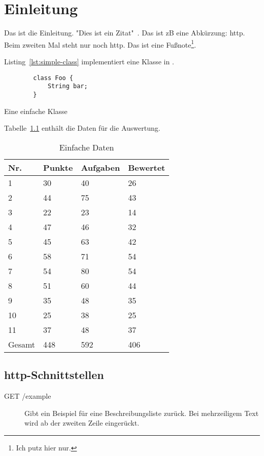 \chapter{Einleitung}\label{ch:introduction}

Das ist die Einleitung.
"Dies ist ein Zitat"~\cite{dragon-book}.
Das ist \ac{zB} eine Abkürzung: \ac{http}.
Beim zweiten Mal steht nur noch \ac{http}.
Das ist eine Fußnote\footnote{Ich putz hier nur.}.

Listing~\ref{lst:simple-class} implementiert eine Klasse in .

\begin{listing}[htp]
    \begin{verbatim}
        class Foo {
            String bar;
        }
    \end{verbatim}
    \caption{Eine einfache Klasse}
    \label{lst:simple-class}
\end{listing}

Tabelle~\ref{tbl:evaluation-data} enthält die Daten für die Auswertung.

\begin{table}[htp]
    \centering
    \caption{Einfache Daten}
    \begin{tabular}{|l|l|l|l|}
    \hline
        Nr. & Punkte & Aufgaben & Bewertet \\
        \hline
        1  & 30 & 40 & 26 \\
        2  & 44 & 75 & 43 \\
        3  & 22 & 23 & 14 \\
        4  & 47 & 46 & 32 \\
        5  & 45 & 63 & 42 \\
        6  & 58 & 71 & 54 \\
        7  & 54 & 80 & 54 \\
        8  & 51 & 60 & 44 \\
        9  & 35 & 48 & 35 \\
        10 & 25 & 38 & 25 \\
        11 & 37 & 48 & 37 \\
        \hline
        Gesamt & 448 & 592 & 406 \\
        \hline
    \end{tabular}
    \label{tbl:evaluation-data}
\end{table}

\section{\acs{http}-Schnittstellen} %

\begin{description}
    \item[GET /example] Gibt ein Beispiel für eine Beschreibungsliste zurück.
    Bei mehrzeiligem Text wird ab der zweiten Zeile eingerückt.
\end{description}
